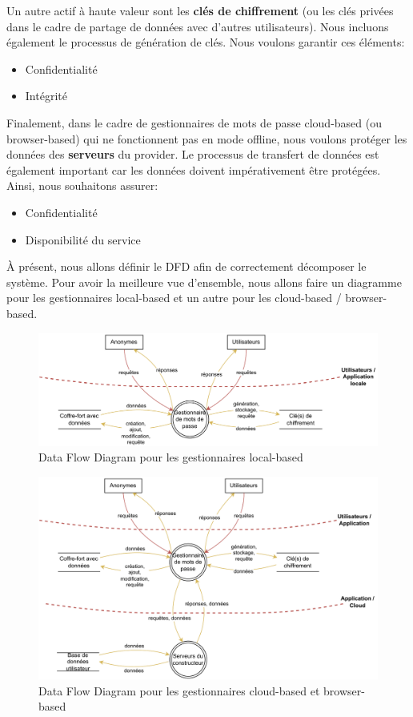 Un autre actif à haute valeur sont les \textbf{clés de chiffrement} (ou les clés privées dans le cadre de partage de données avec d'autres utilisateurs). Nous incluons également le processus de génération de clés. Nous voulons garantir ces éléments:
\begin{itemize}
	\item Confidentialité 
	\item Intégrité
\end{itemize}

Finalement, dans le cadre de gestionnaires de mots de passe cloud-based (ou browser-based) qui ne fonctionnent pas en mode offline, nous voulons protéger les données des \textbf{serveurs} du provider. Le processus de transfert de données est également important car les données doivent impérativement être protégées. Ainsi, nous souhaitons assurer:
\begin{itemize}
	\item Confidentialité
	\item Disponibilité du service
\end{itemize}

À présent, nous allons définir le DFD afin de correctement décomposer le système. Pour avoir la meilleure vue d'ensemble, nous allons faire un diagramme pour les gestionnaires local-based et un autre pour les cloud-based / browser-based.


\begin{figure}[H]
	\includegraphics[width=15.5cm]{images/dfd_local.png}
	\centering
	\caption{Data Flow Diagram pour les gestionnaires local-based}
\end{figure}

\begin{figure}[H]
	\includegraphics[width=15.5cm]{images/dfd_cloud.png}
	\centering
	\caption{Data Flow Diagram pour les gestionnaires cloud-based et browser-based}
\end{figure}

